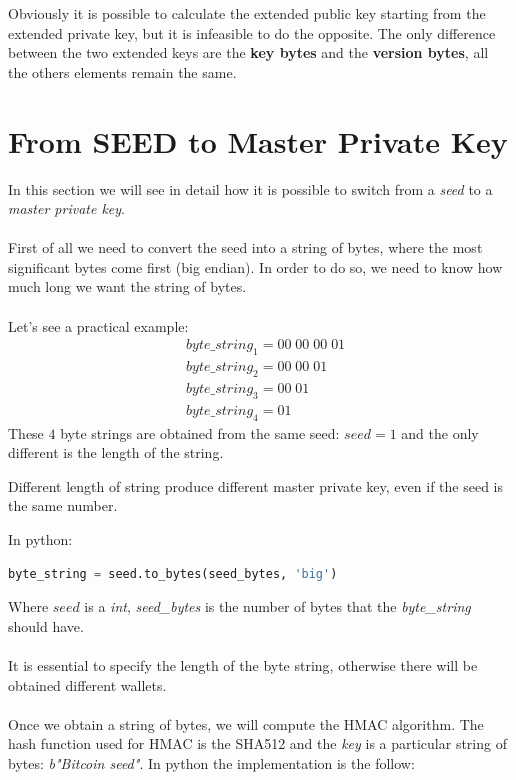 \begin{remark}
	Obviously it is possible to calculate the extended public key starting from the extended private key, but it is infeasible to do the opposite. The only difference between the two extended keys are the \textbf{key bytes} and the \textbf{version bytes}, all the others elements remain the same.
\end{remark}

\section{From SEED to Master Private Key}
In this section we will see in detail how it is possible to switch from a \textit{seed} to a \textit{master private key}. \\ \\
First of all we need to convert the seed into a string of bytes, where the most significant bytes come first (big endian). In order to do so, we need to know how much long we want the string of bytes. \\ \\
Let's see a practical example:
\begin{equation*}
\begin{split}
&byte\_string_1=00\; 00\; 00 \; 01 \\
&byte\_string_2=00\; 00\; 01 \\
&byte\_string_3=00\; 01 \\
&byte\_string_4=01
\end{split}
\end{equation*}
These $4$ byte strings are obtained from the same seed: $seed=1$ and the only different is the length of the string.
\begin{remark}
	Different length of string produce different master private key, even if the seed is the same number.
\end{remark}
In python:
\begin{lstlisting}[language=Python]
byte_string = seed.to_bytes(seed_bytes, 'big')
\end{lstlisting}
Where $seed$ is a \textit{int}, \textit{seed\_bytes} is the number of bytes that the \textit{byte\_string} should have. \\ \\
It is essential to specify the length of the byte string, otherwise there will be obtained different wallets. \\ \\
Once we obtain a string of bytes, we will compute the HMAC algorithm. The hash function used for HMAC is the SHA512 and the \textit{key} is a particular string of bytes: \textit{b"Bitcoin seed"}. In python the implementation is the follow:

